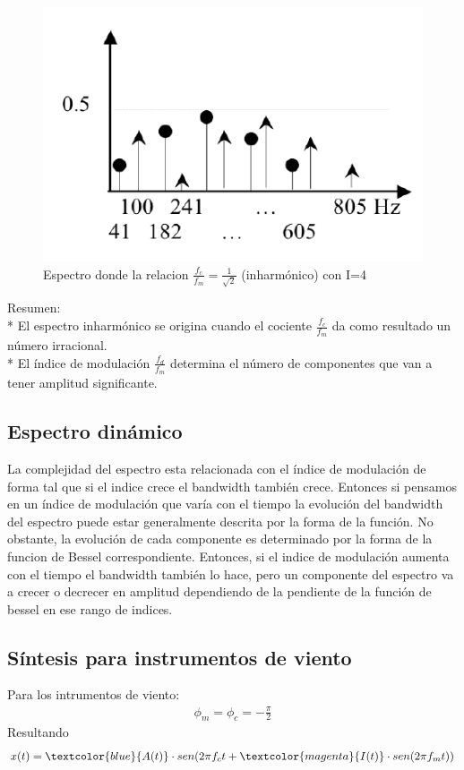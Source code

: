\documentclass[assd_tp2_main.tex]{subfiles}
\begin{document}
\begin{figure}[H]
\centering
\includegraphics[width=0.3\linewidth]{graficos/EJ4/espectroinharmonico.png}
\caption{Espectro donde la relacion $\displaystyle \frac{f_c}{f_m}=\frac{1}{\sqrt{2}}$ (inharmónico) con I=4}
\label{fig:inharmonico}
\end{figure}


Resumen:\\*
El espectro inharmónico se origina cuando el cociente $\displaystyle \frac{f_c}{f_m}$ da como resultado un número irracional. \\*
El índice de modulación $\displaystyle \frac{f_d}{f_m}$ determina el número de componentes que van a tener amplitud significante.

\subsection{Espectro dinámico}
La complejidad del espectro esta relacionada con el índice de modulación de forma tal que si el indice crece el bandwidth también crece. Entonces si pensamos en un índice de modulación que varía con el tiempo la evolución del bandwidth del espectro puede estar generalmente descrita por la forma de la función.
No obstante, la evolución de cada componente es determinado por la forma de la funcion de Bessel correspondiente.
Entonces, si el indice de modulación aumenta con el tiempo el bandwidth también lo hace, pero un componente del espectro va a crecer o decrecer en amplitud dependiendo de la pendiente de la función de bessel en ese rango de indices.



\subsection{Síntesis para instrumentos de viento}
Para los intrumentos de viento:
\begin{eqnarray*}
\displaystyle \phi_m=\phi_c=-\frac{\pi}{2}
\end{eqnarray*}
Resultando
\begin{eqnarray*}
\textstyle x(t)=\textcolor{blue}{A(t)}\cdot sen(2\pi f_c t+\textcolor{magenta}{I(t)}\cdot sen(2\pi f_mt))
\end{eqnarray*}
\end{document}
